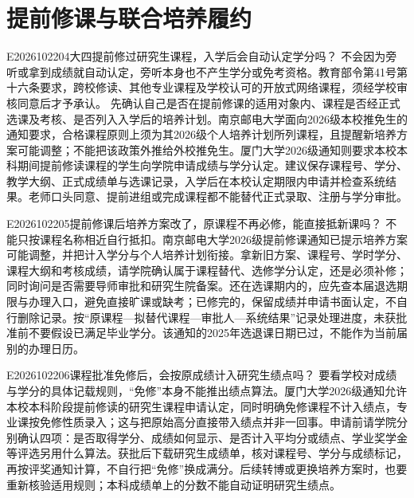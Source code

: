 \section{提前修课与联合培养履约}
\begin{qa}{E2026102204}{大四提前修过研究生课程，入学后会自动认定学分吗？}
不会因为旁听或拿到成绩就自动认定，旁听本身也不产生学分或免考资格。教育部令第41号第十六条要求，跨校修读、其他专业课程及学校认可的开放式网络课程，须经学校审核同意后才予承认。 先确认自己是否在提前修课的适用对象内、课程是否经正式选课及考核、是否列入入学后的培养计划。南京邮电大学面向2026级本校推免生的通知要求，合格课程原则上须为其2026级个人培养计划所列课程，且提醒新培养方案可能调整；不能把该政策外推给外校推免生。厦门大学2026级通知则要求本校本科期间提前修读课程的学生向学院申请成绩与学分认定。建议保存课程号、学分、教学大纲、正式成绩单与选课记录，入学后在本校认定期限内申请并检查系统结果。老师口头同意、提前进组或完成课程都不能替代正式录取、注册与学分审批。
\end{qa}

\begin{qa}{E2026102205}{提前修课后培养方案改了，原课程不再必修，能直接抵新课吗？}
不能只按课程名称相近自行抵扣。南京邮电大学2026级提前修课通知已提示培养方案可能调整，并把计入学分与个人培养计划衔接。拿新旧方案、课程号、学时学分、课程大纲和考核成绩，请学院确认属于课程替代、选修学分认定，还是必须补修；同时询问是否需要导师审批和研究生院备案。还在选课期内的，应先查本届退选期限与办理入口，避免直接旷课或缺考；已修完的，保留成绩并申请书面认定，不自行删除记录。按“原课程—拟替代课程—审批人—系统结果”记录处理进度，未获批准前不要假设已满足毕业学分。该通知的2025年选退课日期已过，不能作为当前届别的办理日历。
\end{qa}

\begin{qa}{E2026102206}{课程批准免修后，会按原成绩计入研究生绩点吗？}
要看学校对成绩与学分的具体记载规则，“免修”本身不能推出绩点算法。厦门大学2026级通知允许本校本科阶段提前修读的研究生课程申请认定，同时明确免修课程不计入绩点，专业课按免修性质录入；这与把原始高分直接带入绩点并非一回事。申请前请学院分别确认四项：是否取得学分、成绩如何显示、是否计入平均分或绩点、学业奖学金等评选另用什么算法。获批后下载研究生成绩单，核对课程号、学分与成绩标记，再按评奖通知计算，不自行把“免修”换成满分。后续转博或更换培养方案时，也要重新核验适用规则；本科成绩单上的分数不能自动证明研究生绩点。
\end{qa}

